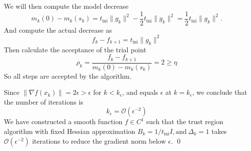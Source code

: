 \documentclass{ExerciseSheet}
\newif\ifsolutions
\begin{document}
\begin{solution}
We will then compute the model decrease
\[
m_k(0) - m_k(s_k) = t_{\text{ini}} \|g_k\|^2 - \frac{1}{2} t_{\text{ini}} \|g_k\|^2 = \frac{1}{2} t_{\text{ini}} \|g_k\|^2.
\]
And compute the actual  decrease as
\[
f_k - f_{k+1} = t_{\text{ini}} \|g_k\|^2
\]
Then calculate the acceptance of the trial point
\[
\rho_k = \frac{f_k - f_{k+1}}{m_k(0) - m_k(s_k)} = 2 \geq \eta
\]
So all steps are accepted by the algorithm.\\
\vskip 0.2cm

Since $ \|\nabla f(x_k)\| = 2\epsilon > \epsilon $ for $ k < k_\epsilon $, and equals $ \epsilon $ at $ k = k_\epsilon $, we conclude that the number of iterations is
\[
 k_\epsilon = \mathcal{O}(\epsilon^{-2})
\]
We have constructed a smooth function $ f \in C^1 $ such that the trust region algorithm with fixed Hessian approximation $ B_k = 1/t_{\text{ini}} I, \text{and}\  \Delta_k = 1 $ takes $ \mathcal{O}(\epsilon^{-2}) $ iterations to reduce the gradient norm below $ \epsilon $. \qed
\end{solution}


 \fi

\vskip 0.5cm

\end{document}
